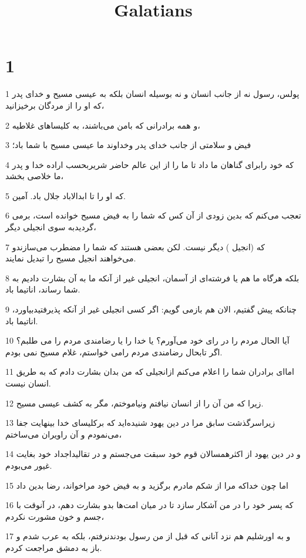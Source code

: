 

\title{Galatians}


\chapter{1}

\par 1 پولس، رسول نه از جانب انسان و نه بوسیله انسان بلکه به عیسی مسیح و خدای پدر که او را از مردگان برخیزانید،
\par 2 و همه برادرانی که بامن می‌باشند، به کلیساهای غلاطیه،
\par 3 فیض و سلامتی از جانب خدای پدر وخداوند ما عیسی مسیح با شما باد؛
\par 4 که خود رابرای گناهان ما داد تا ما را از این عالم حاضر شریربحسب اراده خدا و پدر ما خلاصی بخشد،
\par 5 که او را تا ابدالاباد جلال باد. آمین.
\par 6 تعجب می‌کنم که بدین زودی از آن کس که شما را به فیض مسیح خوانده است، برمی گردیدبه سوی انجیلی دیگر،
\par 7 که (انجیل ) دیگر نیست. لکن بعضی هستند که شما را مضطرب می‌سازندو می‌خواهند انجیل مسیح را تبدیل نمایند.
\par 8 بلکه هرگاه ما هم یا فرشته‌ای از آسمان، انجیلی غیر از آنکه ما به آن بشارت دادیم به شما رساند، اناتیما باد.
\par 9 چنانکه پیش گفتیم، الان هم بازمی گویم: اگر کسی انجیلی غیر از آنکه پذیرفتیدبیاورد، اناتیما باد.
\par 10 آیا الحال مردم را در رای خود می‌آورم؟ یا خدا را یا رضامندی مردم را می طلبم؟ اگر تابحال رضامندی مردم رامی خواستم، غلام مسیح نمی بودم.
\par 11 اما‌ای برادران شما را اعلام می‌کنم ازانجیلی که من بدان بشارت دادم که به طریق انسان نیست.
\par 12 زیرا که من آن را از انسان نیافتم ونیاموختم، مگر به کشف عیسی مسیح.
\par 13 زیراسرگذشت سابق مرا در دین یهود شنیده‌اید که برکلیسای خدا بینهایت جفا می‌نمودم و آن راویران می‌ساختم،
\par 14 و در دین یهود از اکثرهمسالان قوم خود سبقت می‌جستم و در تقالیداجداد خود بغایت غیور می‌بودم.
\par 15 اما چون خداکه مرا از شکم مادرم برگزید و به فیض خود مراخواند، رضا بدین داد
\par 16 که پسر خود را در من آشکار سازد تا در میان امت‌ها بدو بشارت دهم، در آنوقت با جسم و خون مشورت نکردم،
\par 17 و به اورشلیم هم نزد آنانی که قبل از من رسول بودندنرفتم، بلکه به عرب شدم و باز به دمشق مراجعت کردم.
